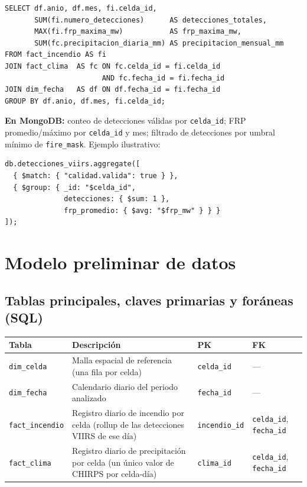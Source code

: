 \documentclass[11pt,a4paper]{article}
\begin{document}
\begin{footnotesize}
\begin{verbatim}
SELECT df.anio, df.mes, fi.celda_id,
       SUM(fi.numero_detecciones)      AS detecciones_totales,
       MAX(fi.frp_maxima_mw)           AS frp_maxima_mw,
       SUM(fc.precipitacion_diaria_mm) AS precipitacion_mensual_mm
FROM fact_incendio AS fi
JOIN fact_clima  AS fc ON fc.celda_id = fi.celda_id
                       AND fc.fecha_id = fi.fecha_id
JOIN dim_fecha   AS df ON df.fecha_id = fi.fecha_id
GROUP BY df.anio, df.mes, fi.celda_id;
\end{verbatim}
\end{footnotesize}

\textbf{En MongoDB:} conteo de detecciones v\'alidas por \texttt{celda\_id}; FRP promedio/m\'aximo por \texttt{celda\_id} y mes; filtrado de detecciones por umbral m\'inimo de \texttt{fire\_mask}. Ejemplo ilustrativo:

\begin{footnotesize}
\begin{verbatim}
db.detecciones_viirs.aggregate([
  { $match: { "calidad.valida": true } },
  { $group: { _id: "$celda_id",
              detecciones: { $sum: 1 },
              frp_promedio: { $avg: "$frp_mw" } } }
]);
\end{verbatim}
\end{footnotesize}

\section{Modelo preliminar de datos}

\subsection{Tablas principales, claves primarias y for\'aneas (SQL)}

\begin{center}
\small
\begin{tabular}{@{}L{3.0cm}L{6.6cm}C{2.3cm}C{3.2cm}@{}}
\toprule
\textbf{Tabla} & \textbf{Descripci\'on} & \textbf{PK} & \textbf{FK} \\
\midrule
\texttt{dim\_celda} & Malla espacial de referencia (una fila por celda) & \texttt{celda\_id} & --- \\
\texttt{dim\_fecha} & Calendario diario del periodo analizado & \texttt{fecha\_id} & --- \\
\texttt{fact\_incendio} & Registro diario de incendio por celda (rollup de las detecciones VIIRS de ese d\'ia) & \texttt{incendio\_id} & \texttt{celda\_id}, \texttt{fecha\_id} \\
\texttt{fact\_clima} & Registro diario de precipitaci\'on por celda (un \'unico valor de CHIRPS por celda-d\'ia) & \texttt{clima\_id} & \texttt{celda\_id}, \texttt{fecha\_id} \\
\bottomrule
\end{tabular}
\end{center}
\end{document}

